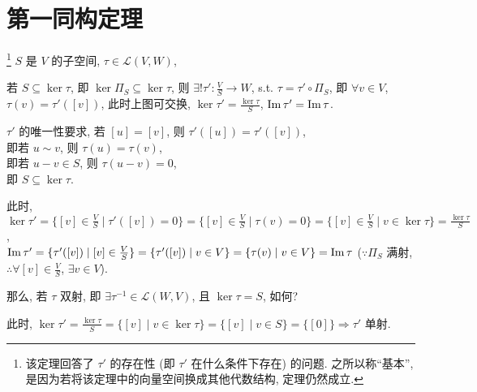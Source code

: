 \documentclass{note}
\begin{document}
\section{第一同构定理}
\begin{thm}
    \footnote{该定理回答了 $\tau'$ 的存在性 (即 $\tau'$ 在什么条件下存在) 的问题. 之所以称``基本'', 是因为若将该定理中的向量空间换成其他代数结构, 定理仍然成立.} $S$ 是 $V$ 的子空间, $\tau\in\mathcal{L}(V,W)$,
    \begin{center}
    \end{center}
    若 $S\subseteq\ker\tau$, 即 $\ker\Pi_S\subseteq\ker\tau$, 则 $\exists!\tau':\frac{V}{S}\rightarrow W$, s.t. $\tau=\tau'\circ\Pi_S$, 即 $\forall v\in V$, $\tau(v)=\tau'([v])$, 此时上图可交换, $\ker\tau'=\frac{\ker\tau}{S}$, $\operatorname{Im}\tau'=\operatorname{Im}\tau$.
\end{thm}
\begin{pf}
    $\tau'$ 的唯一性要求, 若 $[u]=[v]$, 则 $\tau'([u])=\tau'([v])$,\\
    即若 $u\sim v$, 则 $\tau(u)=\tau(v)$,\\
    即若 $u-v\in S$, 则 $\tau(u-v)=0$,\\
    即 $S\subseteq\ker\tau$.

    此时, $\ker\tau'=\{[v]\in\frac{V}{S}\mid\tau'([v])=0\}=\{[v]\in\frac{V}{S}\mid \tau(v)=0\}=\{[v]\in\frac{V}{S}\mid v\in\ker\tau\}=\frac{\ker\tau}{S}$,\\
    $\operatorname{Im}\tau'=\{\tau'([v])\mid[v]\in\frac{V}{S}\}=\{\tau'([v])\mid v\in V\}=\{\tau(v)\mid v\in V\}=\operatorname{Im}\tau$ ($\because\Pi_S$ 满射, $\therefore\forall[v]\in\frac{V}{S}$, $\exists v\in V$).
\end{pf}

那么, 若 $\tau$ 双射, 即 $\exists\tau^{-1}\in\mathcal{L}(W,V)$, 且 $\ker\tau=S$, 如何?
\begin{center}
\end{center}
此时, $\ker\tau'=\frac{\ker\tau}{S}=\{[v]\mid v\in\ker\tau\}=\{[v]\mid v\in S\}=\{[0]\}\Longrightarrow\tau'$ 单射.
\end{document}
